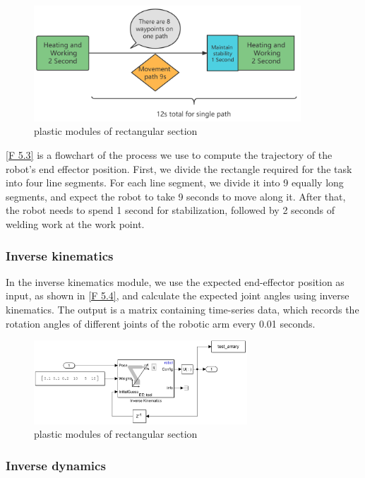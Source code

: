 \begin{figure}[htbp]
	\centering
	\includegraphics[width=10cm]{./fig/siwei.png}
	\caption{plastic modules of rectangular section  }
	\label{F 5.3}
\end{figure}

\autoref{F 5.3} is a flowchart of the process we use to compute the trajectory of the robot's end effector position. First, we divide the rectangle required for the task into four line segments. For each line segment, we divide it into 9 equally long segments, and expect the robot to take 9 seconds to move along it. After that, the robot needs to spend 1 second for stabilization, followed by 2 seconds of welding work at the work point.

\subsubsection*{Inverse kinematics}

In the inverse kinematics module, we use the expected end-effector position as input, as shown in \autoref{F 5.4}, and calculate the expected joint angles using inverse kinematics. The output is a matrix containing time-series data, which records the rotation angles of different joints of the robotic arm every 0.01 seconds.
\begin{figure}[htbp]
	\centering
	\includegraphics[width=8cm]{./fig/IK.png}
	\caption{plastic modules of rectangular section  }
	\label{F 5.4}
\end{figure}

\subsubsection*{Inverse dynamics}

